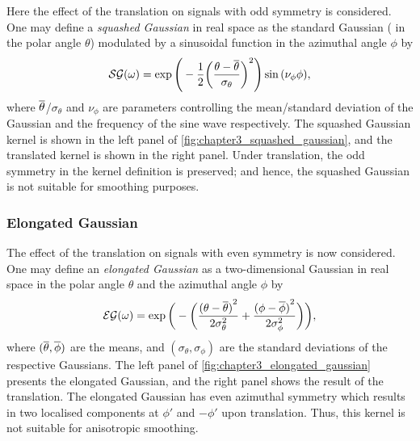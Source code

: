 Here the effect of the translation on signals with odd symmetry is considered.
One may define a \emph{squashed Gaussian} in real space as the standard Gaussian (\ie{} in the polar angle \(\theta{}\)) modulated by a sinusoidal function in the azimuthal angle \(\phi{}\) by
%
\begin{equation}\label{eq:chapter3_squashed_gaussian}
	\mathcal{SG}(\omega)
	= \exp\Bigg(-\frac{1}{2}{\bigg(\frac{\theta-\overline{\theta}}{\sigma_{\theta}}\bigg)}^{2}\Bigg)
	\sin{(\nu_{\phi}\phi)},
\end{equation}
%
where \(\overline{\theta}\)/\(\sigma_{\theta}\) and \(\nu_{\phi}\) are parameters controlling the mean/standard deviation of the Gaussian and the frequency of the sine wave respectively.
The squashed Gaussian kernel is shown in the left panel of \cref{fig:chapter3_squashed_gaussian}, and the translated kernel is shown in the right panel.
Under translation, the odd symmetry in the kernel definition is preserved; and hence, the squashed Gaussian is not suitable for smoothing purposes.



\subsubsection{Elongated Gaussian}

The effect of the translation on signals with even symmetry is now considered.
One may define an \emph{elongated Gaussian} as a two-dimensional Gaussian in real space in the polar angle \(\theta{}\) and the azimuthal angle \(\phi{}\) by
%
\begin{equation}\label{eq:chapter3_elongated_gaussian}
	\mathcal{EG}(\omega)
	= \exp\bigg(-\bigg(\frac{{(\theta-\overline{\theta})}^{2}}{2\sigma_{\theta}^{2}}
		+ \frac{{(\phi-\overline{\phi})}^{2}}{2\sigma_{\phi}^{2}}\bigg)\bigg),
\end{equation}
%
where \((\overline{\theta},\overline{\phi})\) are the means, and \((\sigma_{\theta},\sigma_{\phi})\) are the standard deviations of the respective Gaussians.
The left panel of \cref{fig:chapter3_elongated_gaussian} presents the elongated Gaussian, and the right panel shows the result of the translation.
The elongated Gaussian has even azimuthal symmetry which results in two localised components at \(\phi'\) and \(-\phi'\) upon translation.
Thus, this kernel is not suitable for anisotropic smoothing.



